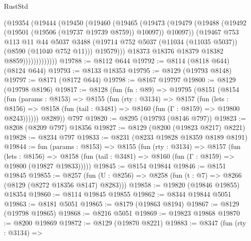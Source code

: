 \begin{lexlean}{RustStd}
\begin{coremodule}
                      (@19354
                        (@19444
                          (@19450
                            (@19460
                              (@19465
                                (@19473
                                  (@19479
                                    (@19488
                                      (@19492 (@19501 (@19506 (@19737 @19739 @8759)) @10097))
                                      @10097))
                                  (@19467
                                    @753
                                    @113
                                    @11
                                    @44
                                    @5037
                                    @3488
                                    (@19714
                                      @752
                                      @5037
                                      (@11034 (@11035 @5037))
                                      (@8590 (@11040 @752 @11)))
                                    @19579)))
                              @18373
                              @18376
                              @18379
                              @18382
                              @8859)))))))))))))
@19788 := @8112 @644
@19792 := @8114 (@8118 @644) (@8124 @644)
@19793 := @8133 @18353
@19795 := @8129 (@19793 @8148)
@19797 := @8171 (@8172 @644)
@19798 := @8167 @19797
@19800 := @8129 (@19798 @8196)
@19817 := @8128
    (fun (fn : @89) =>
    @19795
      (@8151
        (@8154
          (fun (params : @8153) =>
          @8155
            (fun (rty : @3134) =>
            @8157
              (fun (lets : @8156) =>
              @8158 (fun (tail : @3481) => @8160 (fun (Γ : @8159) => @19800 @8243))))))
        @8289))
    @797
@19820 := @8295 (@19793 (@8146 @797))
@19823 := @8208 (@8209 @797) @18356
@19827 := @8129 (@8200 (@19823 @8217) @8221)
@19828 := @8234 @797
@19833 := @8231 (@8233 @19828 @18359 @8189 @8191)
@19844 := fun (params : @8153) =>
  @8155
    (fun (rty : @3134) =>
    @8157
      (fun (lets : @8156) =>
      @8158 (fun (tail : @3481) => @8160 (fun (Γ : @8159) => @19800 (@19827 @19833)))))
@19845 := @8154 @19844
@19846 := @8151 @19845
@19855 := @8257
    (fun (U : @8256) => @8258 (fun (t : @7) => @8266 (@8129 (@8272 @18356 @8147) @8283)))
@19858 := @19820 (@19846 @19855) @18354
@19860 := @8114 @19845 @19855
@19862 := @8344 @19844 @5051
@19863 := @8181 @5051
@19865 := @8179 (@19863 @8194)
@19867 := @8129 (@19798 @19865)
@19868 := @8216 @5051
@19869 := @19823 @19868
@19870 := @8200 @19869
@19872 := @8129 (@19870 @8221)
@19883 := @8347
    (fun (rty : @3134) =>

\end{coremodule}
\end{lexlean}
